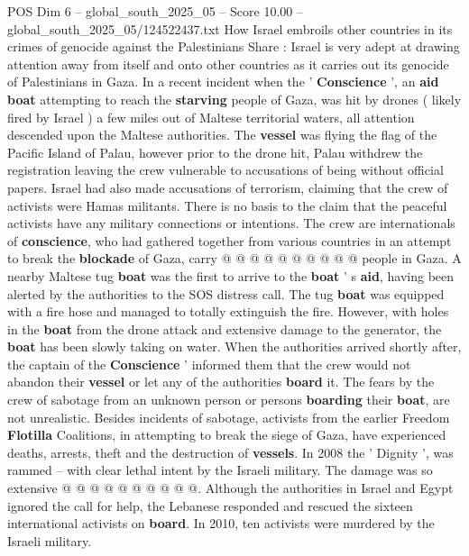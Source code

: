 \begin{textsample}{POS Dim 6 – global\_south\_2025\_05 – Score 10.00 – global\_south\_2025\_05/124522437.txt}  \label{ex:f6_pos_053}
How Israel embroils other countries in its crimes of genocide against the Palestinians Share : Israel is very adept at drawing attention away from itself and onto other countries as it carries out its genocide of Palestinians in Gaza.
In a recent incident when the ' \textbf{Conscience} ', an \textbf{aid} \textbf{boat} attempting to reach the \textbf{starving} people of Gaza, was hit by drones ( likely fired by Israel ) a few miles out of Maltese territorial waters, all attention descended upon the Maltese authorities.
The \textbf{vessel} was flying the flag of the Pacific Island of Palau, however prior to the drone hit, Palau withdrew the registration leaving the crew vulnerable to accusations of being without official papers.
Israel had also made accusations of terrorism, claiming that the crew of activists were Hamas militants.
There is no basis to the claim that the peaceful activists have any military connections or intentions.
The crew are internationals of \textbf{conscience}, who had gathered together from various countries in an attempt to break the \textbf{blockade} of Gaza, carry @ @ @ @ @ @ @ @ @ @ people in Gaza.
A nearby Maltese tug \textbf{boat} was the first to arrive to the \textbf{boat} ' s \textbf{aid}, having been alerted by the authorities to the SOS distress call.
The tug \textbf{boat} was equipped with a fire hose and managed to totally extinguish the fire.
However, with holes in the \textbf{boat} from the drone attack and extensive damage to the generator, the \textbf{boat} has been slowly taking on water.
When the authorities arrived shortly after, the captain of the \textbf{Conscience} ' informed them that the crew would not abandon their \textbf{vessel} or let any of the authorities \textbf{board} it.
The fears by the crew of sabotage from an unknown person or persons \textbf{boarding} their \textbf{boat}, are not unrealistic.
Besides incidents of sabotage, activists from the earlier Freedom \textbf{Flotilla} Coalitions, in attempting to break the siege of Gaza, have experienced deaths, arrests, theft and the destruction of \textbf{vessels}.
In 2008 the ' Dignity ', was rammed -- with clear lethal intent by the Israeli military.
The damage was so extensive @ @ @ @ @ @ @ @ @ @.
Although the authorities in Israel and Egypt ignored the call for help, the Lebanese responded and rescued the sixteen international activists on \textbf{board}.
In 2010, ten activists were murdered by the Israeli military.

\end{textsample}
